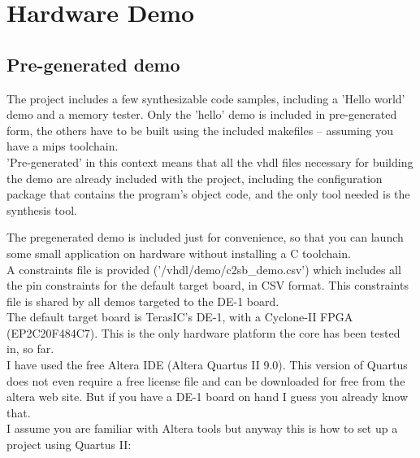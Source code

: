 \chapter{Hardware Demo}
\label{hw_demo}

\section{Pre-generated demo}
\label{pregenerated_demo}

    The project includes a few synthesizable code samples, including a 
    'Hello world' demo and a memory tester. Only the 'hello' demo is included 
    in pre-generated form, the others have to be built using the included 
    makefiles -- assuming you have a mips toolchain.\\

    'Pre-generated' in this context means that all the vhdl files necessary for 
    building the demo are already included with the project, including the 
    configuration package that contains the program's object code, and the only 
    tool needed is the synthesis tool.
    
    The pregenerated demo is included just for convenience, so that you can 
    launch some small application on hardware without installing a C toolchain.\\
    
    A constraints file is provided ('/vhdl/demo/c2sb\_demo.csv') which includes
    all the pin constraints for the default target board, in CSV format. This
    constraints file is shared by all demos targeted to the DE-1 board.\\

    The default target board is TerasIC's DE-1, with a Cyclone-II FPGA 
    (EP2C20F484C7). This is the only hardware platform the core has been 
    tested in, so far.\\

    I have used the free Altera IDE (Altera Quartus II 9.0). This version of
    Quartus does not even require a free license file and can be downloaded for
    free from the altera web site. But if you have a DE-1 board on hand I guess
    you already know that.\\

    I assume you are familiar with Altera tools but anyway this is how to set up
    a project using Quartus II:

